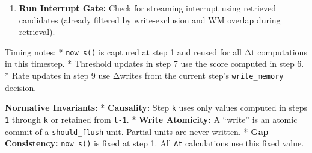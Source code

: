 \documentclass[
  letterpaper,
  DIV=11,
  numbers=noendperiod]{scrartcl}
\providecommand{\tightlist}{%
  \setlength{\itemsep}{0pt}\setlength{\parskip}{0pt}}
\begin{document}
\begin{enumerate}
  \begin{itemize}
  \tightlist
  \item
    If \texttt{write\_memory}: Write to \texttt{memory\_stream}. Update
    \texttt{last\_write\_ts}.
  \item
    Cache \texttt{q\_retrieval\ ←\ μ\_acc} before any accumulator reset.
  \item
    Run streaming pacing and retrieval using \texttt{q\_retrieval}.
  \item
    Update \texttt{rate\_state} (homeostatic controller).
  \item
    If \texttt{should\_flush} (regardless of write): Call
    \texttt{reset\_accumulator()}.
  \end{itemize}
\item
  \textbf{Run Interrupt Gate:} Check for streaming interrupt using
  retrieved candidates (already filtered by write‑exclusion and WM
  overlap during retrieval).
\end{enumerate}

Timing notes: * \texttt{now\_s()} is captured at step 1 and reused for
all Δt computations in this timestep. * Threshold updates in step 7 use
the score computed in step 6. * Rate updates in step 9 use Δwrites from
the current step's \texttt{write\_memory} decision.

\textbf{Normative Invariants:} * \textbf{Causality:} Step \texttt{k}
uses only values computed in steps \texttt{1} through \texttt{k} or
retained from \texttt{t-1}. * \textbf{Write Atomicity:} A ``write'' is
an atomic commit of a \texttt{should\_flush} unit. Partial units are
never written. * \textbf{Gap Consistency:} \texttt{now\_s()} is fixed at
step 1. All \texttt{Δt} calculations use this fixed value.
\end{document}
